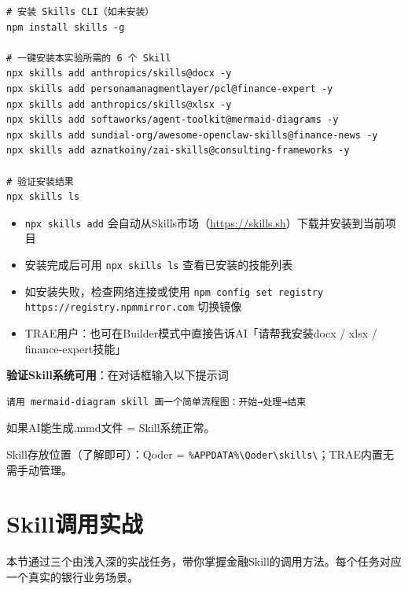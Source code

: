 \begin{lstlisting}[style=shell]
# 安装 Skills CLI（如未安装）
npm install skills -g

# 一键安装本实验所需的 6 个 Skill
npx skills add anthropics/skills@docx -y
npx skills add personamanagmentlayer/pcl@finance-expert -y
npx skills add anthropics/skills@xlsx -y
npx skills add softaworks/agent-toolkit@mermaid-diagrams -y
npx skills add sundial-org/awesome-openclaw-skills@finance-news -y
npx skills add aznatkoiny/zai-skills@consulting-frameworks -y

# 验证安装结果
npx skills ls
\end{lstlisting}

\begin{notebox}[安装说明]
\begin{itemize}[leftmargin=1em]
  \item \texttt{npx skills add} 会自动从Skills市场（\url{https://skills.sh}）下载并安装到当前项目
  \item 安装完成后可用 \texttt{npx skills ls} 查看已安装的技能列表
  \item 如安装失败，检查网络连接或使用 \texttt{npm config set registry https://registry.npmmirror.com} 切换镜像
  \item TRAE用户：也可在Builder模式中直接告诉AI「请帮我安装docx / xlsx / finance-expert技能」
\end{itemize}
\end{notebox}

\textbf{验证Skill系统可用}：在对话框输入以下提示词

\begin{lstlisting}
请用 mermaid-diagram skill 画一个简单流程图：开始→处理→结束
\end{lstlisting}

如果AI能生成.mmd文件 = Skill系统正常。

Skill存放位置（了解即可）：Qoder = \texttt{\%APPDATA\%\textbackslash Qoder\textbackslash skills\textbackslash}；TRAE内置无需手动管理。

\section{Skill调用实战}

本节通过三个由浅入深的实战任务，带你掌握金融Skill的调用方法。每个任务对应一个真实的银行业务场景。

